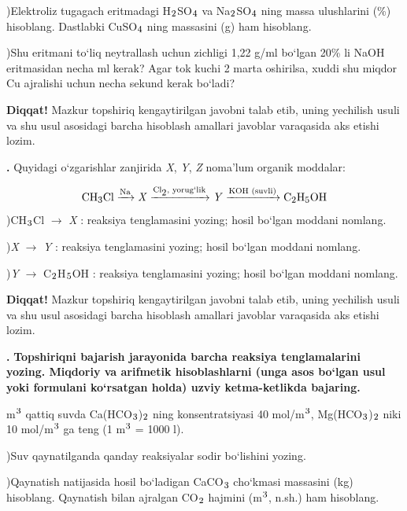 \documentclass[11pt,a4paper]{article}
\renewcommand{\textsubscript}[1]{\ensuremath{_{\text{\fontsize{8}{8}\selectfont #1}}}}
\renewcommand{\textsuperscript}[1]{\ensuremath{^{\text{\fontsize{8}{8}\selectfont #1}}}}
\newcommand{\qn}[1]{\textbf{\fontsize{11.5}{13}\selectfont #1}}
\newcommand{\qsep}{\par\vspace{1pt}\noindent\rule{0pt}{0.4pt}\par\vspace{5pt}}
\newcommand{\diqqat}[1]{\par\smallskip\noindent\textbf{Diqqat!} #1\par\medskip}
\begin{document}
)Elektroliz tugagach eritmadagi H\textsubscript{2}SO\textsubscript{4} va Na\textsubscript{2}SO\textsubscript{4} ning massa ulushlarini (\%) hisoblang. Dastlabki CuSO\textsubscript{4} ning massasini (g) ham hisoblang.\par
{})Shu eritmani to`liq neytrallash uchun zichligi 1,22 g/ml bo`lgan 20\% li NaOH eritmasidan necha ml kerak? Agar tok kuchi 2 marta oshirilsa, xuddi shu miqdor Cu ajralishi uchun necha sekund kerak bo`ladi?\par
\diqqat{Mazkur topshiriq kengaytirilgan javobni talab etib, uning yechilish usuli va shu usul asosidagi barcha hisoblash amallari javoblar varaqasida aks etishi lozim.}\qsep
\noindent\qn{42.} Quyidagi o`zgarishlar zanjirida \textit{X}, \textit{Y}, \textit{Z} noma'lum organik moddalar:\par
\[\setlength{\fboxsep}{0pt}\text{CH\textsubscript{3}Cl}\xrightarrow{\text{Na}}\text{\textit{X}}\xrightarrow{\text{Cl\textsubscript{2}, yorug`lik}}\text{\textit{Y}}\xrightarrow{\text{KOH (suvli)}}\text{C\textsubscript{2}H\textsubscript{5}OH}\]
)CH\textsubscript{3}Cl $\to$ \textit{X} : reaksiya tenglamasini yozing; hosil bo`lgan moddani nomlang.\par
{})\textit{X} $\to$ \textit{Y} : reaksiya tenglamasini yozing; hosil bo`lgan moddani nomlang.\par
{})\textit{Y} $\to$ C\textsubscript{2}H\textsubscript{5}OH : reaksiya tenglamasini yozing; hosil bo`lgan moddani nomlang.\par
\diqqat{Mazkur topshiriq kengaytirilgan javobni talab etib, uning yechilish usuli va shu usul asosidagi barcha hisoblash amallari javoblar varaqasida aks etishi lozim.}\qsep
\noindent\qn{43.} \textbf{Topshiriqni bajarish jarayonida barcha reaksiya tenglamalarini yozing. Miqdoriy va arifmetik hisoblashlarni (unga asos bo`lgan usul yoki formulani ko`rsatgan holda) uzviy ketma-ketlikda bajaring.}\par{} m\textsuperscript{3} qattiq suvda Ca(HCO\textsubscript{3})\textsubscript{2} ning konsentratsiyasi 40 mol/m\textsuperscript{3}, Mg(HCO\textsubscript{3})\textsubscript{2} niki 10 mol/m\textsuperscript{3} ga teng (1 m\textsuperscript{3} = 1000 l).\par
{})Suv qaynatilganda qanday reaksiyalar sodir bo`lishini yozing.\par
{})Qaynatish natijasida hosil bo`ladigan CaCO\textsubscript{3} cho`kmasi massasini (kg) hisoblang. Qaynatish bilan ajralgan CO\textsubscript{2} hajmini (m\textsuperscript{3}, n.sh.) ham hisoblang.\par
\end{document}
